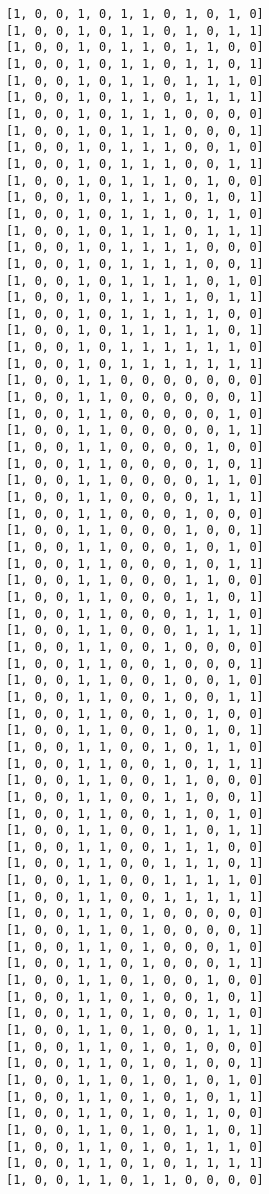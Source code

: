 \documentclass[11pt]{article}
\begin{document}
\begin{Verbatim}[commandchars=\\\{\}]
[1, 0, 0, 1, 0, 1, 1, 0, 1, 0, 1, 0]
[1, 0, 0, 1, 0, 1, 1, 0, 1, 0, 1, 1]
[1, 0, 0, 1, 0, 1, 1, 0, 1, 1, 0, 0]
[1, 0, 0, 1, 0, 1, 1, 0, 1, 1, 0, 1]
[1, 0, 0, 1, 0, 1, 1, 0, 1, 1, 1, 0]
[1, 0, 0, 1, 0, 1, 1, 0, 1, 1, 1, 1]
[1, 0, 0, 1, 0, 1, 1, 1, 0, 0, 0, 0]
[1, 0, 0, 1, 0, 1, 1, 1, 0, 0, 0, 1]
[1, 0, 0, 1, 0, 1, 1, 1, 0, 0, 1, 0]
[1, 0, 0, 1, 0, 1, 1, 1, 0, 0, 1, 1]
[1, 0, 0, 1, 0, 1, 1, 1, 0, 1, 0, 0]
[1, 0, 0, 1, 0, 1, 1, 1, 0, 1, 0, 1]
[1, 0, 0, 1, 0, 1, 1, 1, 0, 1, 1, 0]
[1, 0, 0, 1, 0, 1, 1, 1, 0, 1, 1, 1]
[1, 0, 0, 1, 0, 1, 1, 1, 1, 0, 0, 0]
[1, 0, 0, 1, 0, 1, 1, 1, 1, 0, 0, 1]
[1, 0, 0, 1, 0, 1, 1, 1, 1, 0, 1, 0]
[1, 0, 0, 1, 0, 1, 1, 1, 1, 0, 1, 1]
[1, 0, 0, 1, 0, 1, 1, 1, 1, 1, 0, 0]
[1, 0, 0, 1, 0, 1, 1, 1, 1, 1, 0, 1]
[1, 0, 0, 1, 0, 1, 1, 1, 1, 1, 1, 0]
[1, 0, 0, 1, 0, 1, 1, 1, 1, 1, 1, 1]
[1, 0, 0, 1, 1, 0, 0, 0, 0, 0, 0, 0]
[1, 0, 0, 1, 1, 0, 0, 0, 0, 0, 0, 1]
[1, 0, 0, 1, 1, 0, 0, 0, 0, 0, 1, 0]
[1, 0, 0, 1, 1, 0, 0, 0, 0, 0, 1, 1]
[1, 0, 0, 1, 1, 0, 0, 0, 0, 1, 0, 0]
[1, 0, 0, 1, 1, 0, 0, 0, 0, 1, 0, 1]
[1, 0, 0, 1, 1, 0, 0, 0, 0, 1, 1, 0]
[1, 0, 0, 1, 1, 0, 0, 0, 0, 1, 1, 1]
[1, 0, 0, 1, 1, 0, 0, 0, 1, 0, 0, 0]
[1, 0, 0, 1, 1, 0, 0, 0, 1, 0, 0, 1]
[1, 0, 0, 1, 1, 0, 0, 0, 1, 0, 1, 0]
[1, 0, 0, 1, 1, 0, 0, 0, 1, 0, 1, 1]
[1, 0, 0, 1, 1, 0, 0, 0, 1, 1, 0, 0]
[1, 0, 0, 1, 1, 0, 0, 0, 1, 1, 0, 1]
[1, 0, 0, 1, 1, 0, 0, 0, 1, 1, 1, 0]
[1, 0, 0, 1, 1, 0, 0, 0, 1, 1, 1, 1]
[1, 0, 0, 1, 1, 0, 0, 1, 0, 0, 0, 0]
[1, 0, 0, 1, 1, 0, 0, 1, 0, 0, 0, 1]
[1, 0, 0, 1, 1, 0, 0, 1, 0, 0, 1, 0]
[1, 0, 0, 1, 1, 0, 0, 1, 0, 0, 1, 1]
[1, 0, 0, 1, 1, 0, 0, 1, 0, 1, 0, 0]
[1, 0, 0, 1, 1, 0, 0, 1, 0, 1, 0, 1]
[1, 0, 0, 1, 1, 0, 0, 1, 0, 1, 1, 0]
[1, 0, 0, 1, 1, 0, 0, 1, 0, 1, 1, 1]
[1, 0, 0, 1, 1, 0, 0, 1, 1, 0, 0, 0]
[1, 0, 0, 1, 1, 0, 0, 1, 1, 0, 0, 1]
[1, 0, 0, 1, 1, 0, 0, 1, 1, 0, 1, 0]
[1, 0, 0, 1, 1, 0, 0, 1, 1, 0, 1, 1]
[1, 0, 0, 1, 1, 0, 0, 1, 1, 1, 0, 0]
[1, 0, 0, 1, 1, 0, 0, 1, 1, 1, 0, 1]
[1, 0, 0, 1, 1, 0, 0, 1, 1, 1, 1, 0]
[1, 0, 0, 1, 1, 0, 0, 1, 1, 1, 1, 1]
[1, 0, 0, 1, 1, 0, 1, 0, 0, 0, 0, 0]
[1, 0, 0, 1, 1, 0, 1, 0, 0, 0, 0, 1]
[1, 0, 0, 1, 1, 0, 1, 0, 0, 0, 1, 0]
[1, 0, 0, 1, 1, 0, 1, 0, 0, 0, 1, 1]
[1, 0, 0, 1, 1, 0, 1, 0, 0, 1, 0, 0]
[1, 0, 0, 1, 1, 0, 1, 0, 0, 1, 0, 1]
[1, 0, 0, 1, 1, 0, 1, 0, 0, 1, 1, 0]
[1, 0, 0, 1, 1, 0, 1, 0, 0, 1, 1, 1]
[1, 0, 0, 1, 1, 0, 1, 0, 1, 0, 0, 0]
[1, 0, 0, 1, 1, 0, 1, 0, 1, 0, 0, 1]
[1, 0, 0, 1, 1, 0, 1, 0, 1, 0, 1, 0]
[1, 0, 0, 1, 1, 0, 1, 0, 1, 0, 1, 1]
[1, 0, 0, 1, 1, 0, 1, 0, 1, 1, 0, 0]
[1, 0, 0, 1, 1, 0, 1, 0, 1, 1, 0, 1]
[1, 0, 0, 1, 1, 0, 1, 0, 1, 1, 1, 0]
[1, 0, 0, 1, 1, 0, 1, 0, 1, 1, 1, 1]
[1, 0, 0, 1, 1, 0, 1, 1, 0, 0, 0, 0]

\end{Verbatim}
\end{document}
